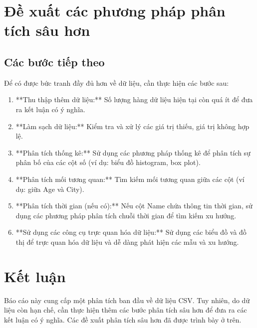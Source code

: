 \documentclass[12pt]{article}
\begin{document}
\section{Đề xuất các phương pháp phân tích sâu hơn}

\subsection{Các bước tiếp theo}

Để có được bức tranh đầy đủ hơn về dữ liệu, cần thực hiện các bước sau:

\begin{enumerate}
    \item **Thu thập thêm dữ liệu:** Số lượng hàng dữ liệu hiện tại còn quá ít để đưa ra kết luận có ý nghĩa.
    \item **Làm sạch dữ liệu:** Kiểm tra và xử lý các giá trị thiếu, giá trị không hợp lệ.
    \item **Phân tích thống kê:** Sử dụng các phương pháp thống kê để phân tích sự phân bố của các cột số (ví dụ: biểu đồ histogram, box plot).
    \item **Phân tích mối tương quan:** Tìm kiếm mối tương quan giữa các cột (ví dụ: giữa Age và City).
    \item **Phân tích thời gian (nếu có):** Nếu cột Name chứa thông tin thời gian, sử dụng các phương pháp phân tích chuỗi thời gian để tìm kiếm xu hướng.
    \item **Sử dụng các công cụ trực quan hóa dữ liệu:** Sử dụng các biểu đồ và đồ thị để trực quan hóa dữ liệu và dễ dàng phát hiện các mẫu và xu hướng.
\end{enumerate}

\section{Kết luận}

Báo cáo này cung cấp một phân tích ban đầu về dữ liệu CSV. Tuy nhiên, do dữ liệu còn hạn chế, cần thực hiện thêm các bước phân tích sâu hơn để đưa ra các kết luận có ý nghĩa. Các đề xuất phân tích sâu hơn đã được trình bày ở trên.
\end{document}
